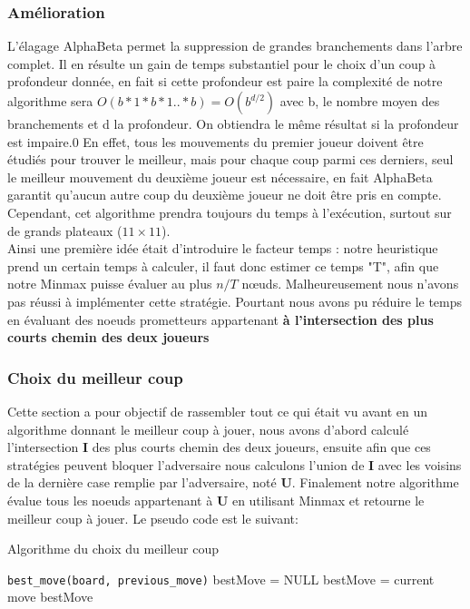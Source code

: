 \documentclass[a4paper,10pt]{article}
\begin{document}
\subsubsection{Amélioration} \label{amel}
L'élagage AlphaBeta permet la suppression de grandes branchements dans l’arbre complet. Il en résulte un gain de temps substantiel pour le choix d’un coup à profondeur donnée, en fait si cette profondeur est paire la complexité de notre algorithme sera $O(b*1*b*1..*b)=O(b^{d/2})$ avec b, le nombre moyen des branchements et d la profondeur. On obtiendra le même résultat si la profondeur est impaire.0 En effet, tous les mouvements du premier joueur doivent être étudiés pour trouver le meilleur, mais pour chaque coup parmi ces derniers, seul le meilleur mouvement du deuxième joueur est nécessaire, en fait AlphaBeta garantit qu'aucun autre coup du deuxième joueur ne doit être pris en compte.\\
Cependant, cet algorithme prendra toujours du temps à l'exécution, surtout sur de grands plateaux ($11 \times 11$). \\
Ainsi une première idée était d'introduire le facteur temps : notre heuristique prend un certain temps à calculer, il faut donc estimer ce temps "T", afin que notre Minmax puisse évaluer au plus $n/T$ nœuds. Malheureusement nous n'avons pas réussi à implémenter cette stratégie. Pourtant nous avons pu réduire le temps en évaluant des noeuds prometteurs appartenant \textbf{à l'intersection des plus courts chemin des deux joueurs}
\subsubsection{Choix du meilleur coup} \label{best}
Cette section a pour objectif de rassembler tout ce qui était vu avant en un algorithme donnant le meilleur coup à jouer, nous avons d'abord calculé l'intersection \textbf{I} des plus courts chemin des deux joueurs, ensuite afin que ces stratégies peuvent bloquer l'adversaire nous calculons l'union de \textbf{I} avec les voisins de la dernière case remplie par l'adversaire, noté \textbf{U}. Finalement notre algorithme évalue tous les noeuds appartenant à \textbf{U} en utilisant Minmax et retourne le meilleur coup à jouer. Le pseudo code est le suivant:
    \begin{algorithm}
\caption{Algorithme du choix du meilleur coup}
\begin{algorithmic}
\STATE \texttt{best\_move(board, previous\_move)}
\STATE bestMove = NULL
\STATE bestMove = current move
\ENDIF
\ENDFOR
\RETURN bestMove
\end{algorithmic}
\end{algorithm}\\
\end{document}
